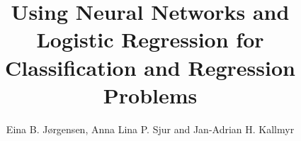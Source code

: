 \documentclass[a4paper, 11pt, twocolumn]{article}
\begin{document}
\title{Using Neural Networks and Logistic Regression for Classification and Regression Problems}

\author{Eina B. Jørgensen, Anna Lina P. Sjur and Jan-Adrian H. Kallmyr}

\twocolumn[
  \begin{@twocolumnfalse}
    \maketitle
    
  \end{@twocolumnfalse}
]
















%
\end{document}
